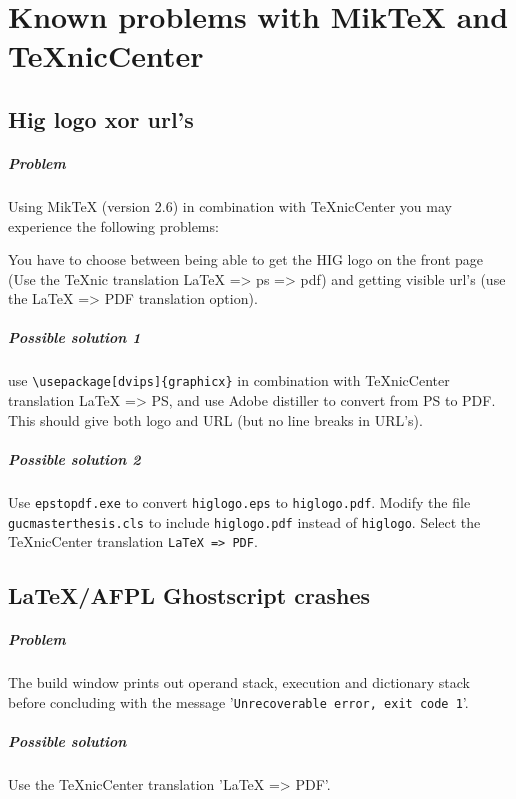 \documentclass[gjovik]{gucmasterproject}
\begin{document}
\appendix
\chapter{Known problems with MikTeX and TeXnicCenter}
\section{Hig logo xor url's}
\paragraph{Problem}
Using MikTeX (version 2.6) in combination with TeXnicCenter you may experience the following problems:

You have to choose between being able to get the HIG logo on the front page (Use the TeXnic translation LaTeX => ps => pdf)  and getting visible url's (use the LaTeX => PDF translation option).

\paragraph{Possible solution 1}
use \verb+\usepackage[dvips]{graphicx}+ in combination with TeXnicCenter translation LaTeX => PS, and use Adobe distiller to convert from PS to PDF.  This should give both logo and URL (but no line breaks in URL's).

\paragraph{Possible solution 2}
Use \verb+epstopdf.exe+ to convert \verb+higlogo.eps+ to \verb+higlogo.pdf+.
Modify the file \verb+gucmasterthesis.cls+ to include \verb+higlogo.pdf+ instead of \verb+higlogo+.
Select the TeXnicCenter translation \verb+LaTeX => PDF+.


\section{\LaTeX/AFPL Ghostscript crashes}
\paragraph{Problem}
The build window prints out operand stack, execution and dictionary stack before concluding with the message 
'\verb+Unrecoverable error, exit code 1+'.
\paragraph{Possible solution}
Use the TeXnicCenter translation 'LaTeX => PDF'.



%


\end{document}
